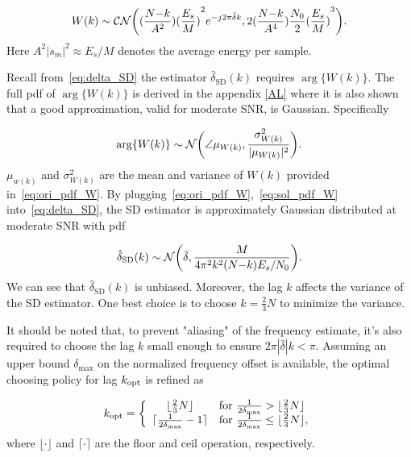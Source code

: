 \begin{equation}
    \label{eq:ori_pdf_W}
    W(k) \sim \mathcal{CN}\bigg((
    \frac{N{-}k}{A^2}){(\frac{E_s}{M})}^2e^{-j2\pi \bar{\delta} k},
    2(\frac{N{-}k}{A^4})\frac{N_0}{2}{(\frac{E_s}{M})}^3\bigg).
  \end{equation}
Here $A^2|s_m|^2 {\approx} E_s/M$ denotes the average energy per
sample.

Recall from~\eqref{eq:delta_SD} the estimator $\hat{\delta}_{\text{SD}}(k)$ requires $\arg\{W(k)\}$.
The full pdf of $\arg\{W(k)\}$ is derived in the appendix \ref{AL}
where it is also shown that a good approximation, valid for moderate SNR, 
is Gaussian. Specifically 

\begin{equation}
    \label{eq:sol_pdf_W}
    \arg\{W(k)\} \sim \mathcal{N}\bigg(\angle \mu_{W(k)},\frac{\sigma^2_{W(k)}}{|\mu_{W(k)}|^2}\bigg).
  \end{equation}
$\mu_{w(k)}$ and $\sigma^2_{W(k)}$ are the mean and variance of $W(k)$ provided in~\eqref{eq:ori_pdf_W}.
By plugging~\eqref{eq:ori_pdf_W},~\eqref{eq:sol_pdf_W} into~\eqref{eq:delta_SD}, the SD estimator
is approximately Gaussian distributed at moderate SNR with pdf

\begin{equation}
    \label{eq:pdf_delta}
        \hat{\delta}_{\text{SD}}(k) \sim \mathcal{N} \bigg(\bar{\delta},\frac{M}{4\pi^2k^2(N{-}k)E_s/N_0}\bigg).
  \end{equation}  
We can see that $\hat{\delta}_{\text{SD}}(k)$ is unbiased. Moreover, the lag $k$ affects the variance of the SD estimator. 
One best choice is to choose $k=\frac{2}{3}N$ to minimize the variance.

It should be noted that, to prevent "aliasing" of the frequency estimate, it's also required to choose the lag $k$ small enough to ensure $2\pi |\bar{\delta}| k < \pi$.
Assuming an upper bound $\delta_{\text{max}}$ on the normalized frequency offset is available, 
the optimal choosing policy for lag $k_{\text{opt}}$ is refined as

\begin{equation}
    \label{eq:est_k_opt}
    k_{\text{opt}}=\left\{
      \begin{array}{cl}
        \lfloor\frac{2}{3}N\rfloor
        & \text{for $\frac{1}{2\delta_{\max}}>\lfloor\frac{2}{3}N\rfloor$} \\
        \lceil\frac{1}{2\delta_{\max}}-1\rceil
        & \text{for $\frac{1}{2\delta_{\max}} \leq\lfloor\frac{2}{3}N\rfloor$},
      \end{array}
    \right.
  \end{equation}
where $\lfloor \cdot \rfloor$ and $\lceil \cdot \rceil$ are the floor and ceil operation, respectively.

